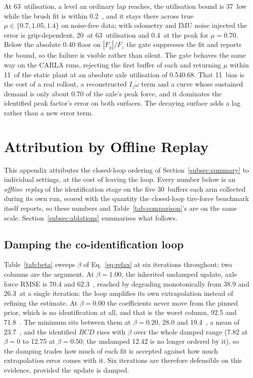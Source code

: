 \documentclass[lineno,12pt]{sn-jnl}
\makeatletter
\newif\ifsiu@prev
\DeclareRobustCommand{\siu@sep}{\ifsiu@prev\,\fi}
\DeclareRobustCommand{\siu@unit}[1]{\siu@sep\text{#1}\siu@prevtrue}
\DeclareRobustCommand{\siu@pre}[1]{\siu@sep\text{#1}\siu@prevfalse}
\DeclareRobustCommand{\siu@div}[1]{\text{#1}\siu@prevfalse}
\DeclareRobustCommand{\meter}{m}
\DeclareRobustCommand{\second}{s}
\DeclareRobustCommand{\gram}{g}
\DeclareRobustCommand{\newton}{N}
\DeclareRobustCommand{\radian}{rad}
\DeclareRobustCommand{\hertz}{Hz}
\DeclareRobustCommand{\percent}{\%}
\DeclareRobustCommand{\g}{\textit{g}}
\DeclareRobustCommand{\kilo}{k}
\DeclareRobustCommand{\milli}{m}
\DeclareRobustCommand{\per}{/}
\DeclareRobustCommand{\squared}{\ensuremath{^{2}}}
\providecommand{\degree}{\ensuremath{^{\circ}}}
\DeclareRobustCommand{\si}[1]{\begingroup
  \siu@prevfalse
  \renewcommand{\meter}{\siu@unit{m}}%
  \renewcommand{\second}{\siu@unit{s}}%
  \renewcommand{\gram}{\siu@unit{g}}%
  \renewcommand{\newton}{\siu@unit{N}}%
  \renewcommand{\radian}{\siu@unit{rad}}%
  \renewcommand{\hertz}{\siu@unit{Hz}}%
  \renewcommand{\percent}{\siu@unit{\%}}%
  \renewcommand{\degree}{\siu@unit{\ensuremath{^{\circ}}}}%
  \renewcommand{\g}{\siu@unit{\textit{g}}}%
  \renewcommand{\kilo}{\siu@pre{k}}%
  \renewcommand{\milli}{\siu@pre{m}}%
  \renewcommand{\per}{\siu@div{/}}%
  \renewcommand{\squared}{\ensuremath{^{2}}}%
  #1\endgroup}
\DeclareRobustCommand{\num}[1]{#1}
\DeclareRobustCommand{\numrange}[2]{#1\text{--}#2}
\DeclareRobustCommand{\SI}[2]{#1\,\si{#2}}
\theoremstyle{thmstyleone}%
\theoremstyle{thmstyletwo}%
\theoremstyle{thmstylethree}%
\makeatother
\begin{document}
\begin{appendices}
At \SI{63}{\percent} utilisation, a level an ordinary lap reaches, the
utilisation bound is \SI{37}{\percent} low while the brush fit is within
\SI{0.2}{\percent}, and it stays there across true $\mu\in\{0.7,1.05,1.4\}$ on
noise-free data; with odometry and IMU noise injected the error is
grip-dependent, \SI{20}{\percent} at \SI{63}{\percent} utilisation and
\SI{0.4}{\percent} at the peak for $\mu=0.70$. Below the absolute \num{0.40}
floor on $|F_{y}|/F_{z}$ the gate suppresses the fit and reports the bound, so
the failure is visible rather than silent. The gate behaves the same way on the
CARLA runs, rejecting the first buffer of each and returning $\mu$ within
\SI{11}{\percent} of the static plant at an absolute axle utilisation of
\numrange{0.54}{0.68}. That \SI{11}{\percent} bias is the cost of a real
rollout, a reconstructed $I_{z}\dot\omega$ term and a curve whose sustained
demand is only about \num{0.70} of the axle's peak force, and it dominates the
identified peak factor's error on both surfaces. The decaying surface adds a
lag rather than a new error term.

\section{Attribution by Offline Replay}
\label{sec:ablations}

This appendix attributes the closed-loop ordering of
Section~\ref{subsec:summary} to individual settings, at the cost of leaving the
loop. Every number below is an \emph{offline replay} of the identification
stage on the five \SI{30}{\second} buffers each arm collected during its own
run, scored with the quantity the closed-loop tire-force benchmark itself
reports, so these numbers and Table~\ref{tab:comparison}'s are on the same
scale. Section~\ref{subsec:ablations} summarises what follows.

\subsection*{Damping the co-identification loop}
Table~\ref{tab:beta} sweeps $\beta$ of Eq.~\eqref{eq:relax} at six iterations
throughout; two columns are the argument. At $\beta=\num{1.00}$, the inherited
undamped update, axle force RMSE is \num{70.4} and \SI{62.3}{\newton}, reached
by degrading monotonically from \num{38.9} and \SI{26.3}{\newton} at a single
iteration: the loop amplifies its own extrapolation instead of refining the
estimate. At $\beta=\num{0.00}$ the coefficients never move from the pinned
prior, which is no identification at all, and that is the worst column,
\num{92.5} and \SI{71.8}{\newton}. The minimum sits between them at
$\beta=\num{0.20}$, \num{28.0} and \SI{19.4}{\newton}, a mean of
\SI{23.7}{\newton}, and the identified $BCD$ rises with $\beta$ over the whole
damped range (\num{7.82} at $\beta=0$ to \num{12.75} at $\beta=\num{0.50}$; the
undamped \num{12.42} is no longer ordered by it), so the damping trades how
much of each fit is accepted against how much extrapolation error comes with
it. Six iterations are therefore defensible on this evidence, provided the
update is damped.


\end{appendices}
\end{document}
